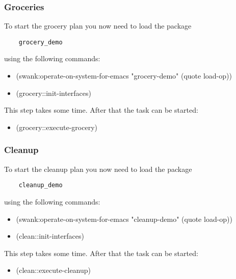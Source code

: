 \documentclass[main.tex]{subfiles}
\begin{document}
	\subsubsection{Groceries}
	To start the grocery plan you now need to load the package \begin{verbatim}
	grocery_demo
	\end{verbatim}
	 using the following commands:
	\begin{itemize}
\item (swank:operate-on-system-for-emacs "grocery-demo" (quote load-op))
\item (grocery::init-interfaces)
\end{itemize}
This step takes some time. After that the task can be started:
\begin{itemize}
\item (grocery::execute-grocery)
\end{itemize}

	\subsubsection{Cleanup}
	To start the cleanup plan you now need to load the package \begin{verbatim}
	cleanup_demo
	\end{verbatim}
	 using the following commands:
	\begin{itemize}
\item (swank:operate-on-system-for-emacs "cleanup-demo" (quote load-op))
\item (clean::init-interfaces)
\end{itemize}
This step takes some time. After that the task can be started:
\begin{itemize}
\item (clean::execute-cleanup)
\end{itemize}
\end{document}
